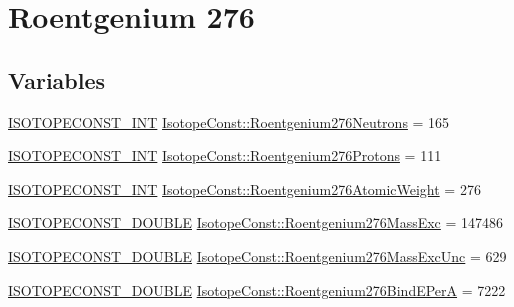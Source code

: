 \hypertarget{group___isotope_const-_roentgenium-_rg276}{}\section{Roentgenium 276}
\label{group___isotope_const-_roentgenium-_rg276}
\subsection*{Variables}
\begin{DoxyCompactItemize}
\item 
\mbox{\hyperlink{group___isotope_const-_macros_ga5f18360b3e99483a35c32d789e62621c}{I\+S\+O\+T\+O\+P\+E\+C\+O\+N\+S\+T\+\_\+\+I\+NT}} \mbox{\hyperlink{group___isotope_const-_roentgenium-_rg276_ga106e3c663ab9a8761a49994273f28cca}{Isotope\+Const\+::\+Roentgenium276\+Neutrons}} = 165
\item 
\mbox{\hyperlink{group___isotope_const-_macros_ga5f18360b3e99483a35c32d789e62621c}{I\+S\+O\+T\+O\+P\+E\+C\+O\+N\+S\+T\+\_\+\+I\+NT}} \mbox{\hyperlink{group___isotope_const-_roentgenium-_rg276_ga6c1f187047b4ecf489da5802b975c448}{Isotope\+Const\+::\+Roentgenium276\+Protons}} = 111
\item 
\mbox{\hyperlink{group___isotope_const-_macros_ga5f18360b3e99483a35c32d789e62621c}{I\+S\+O\+T\+O\+P\+E\+C\+O\+N\+S\+T\+\_\+\+I\+NT}} \mbox{\hyperlink{group___isotope_const-_roentgenium-_rg276_gaffe41aba83c2d24952cb55a6f6ffffca}{Isotope\+Const\+::\+Roentgenium276\+Atomic\+Weight}} = 276
\item 
\mbox{\hyperlink{group___isotope_const-_macros_ga8f45a7272ce02c0b4c65c44636ed719a}{I\+S\+O\+T\+O\+P\+E\+C\+O\+N\+S\+T\+\_\+\+D\+O\+U\+B\+LE}} \mbox{\hyperlink{group___isotope_const-_roentgenium-_rg276_ga443e71ba99a7ac6b3c932a431f822b33}{Isotope\+Const\+::\+Roentgenium276\+Mass\+Exc}} = 147486
\item 
\mbox{\hyperlink{group___isotope_const-_macros_ga8f45a7272ce02c0b4c65c44636ed719a}{I\+S\+O\+T\+O\+P\+E\+C\+O\+N\+S\+T\+\_\+\+D\+O\+U\+B\+LE}} \mbox{\hyperlink{group___isotope_const-_roentgenium-_rg276_gadd31dbbfda841d19440a979631f42dbb}{Isotope\+Const\+::\+Roentgenium276\+Mass\+Exc\+Unc}} = 629
\item 
\mbox{\hyperlink{group___isotope_const-_macros_ga8f45a7272ce02c0b4c65c44636ed719a}{I\+S\+O\+T\+O\+P\+E\+C\+O\+N\+S\+T\+\_\+\+D\+O\+U\+B\+LE}} \mbox{\hyperlink{group___isotope_const-_roentgenium-_rg276_gaa916eb1b017017d0938bd7fd9822c0b7}{Isotope\+Const\+::\+Roentgenium276\+Bind\+E\+PerA}} = 7222

\end{DoxyCompactItemize}
